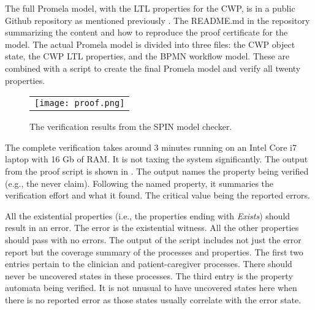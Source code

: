 The full Promela model, with the LTL properties for the CWP, is in a public Github repository as mentioned previously \cite{repo}. The README.md in the repository summarizing the content and how to reproduce the proof certificate for the model. The actual Promela model is divided into three files: the CWP object state, the CWP LTL properties, and the BPMN workflow model. These are combined with a script to create the final Promela model and verify all twenty properties.

\begin{figure}
  \begin{center}
    \begin{tabular}{c}
      \texttt{[image: proof.png]}
    \end{tabular}
  \end{center}
\caption{The verification results from the SPIN model checker.}
\label{fig:proof}
\end{figure}

The complete verification takes around 3 minutes running on an Intel Core i7 laptop with 16 Gb of RAM. It is not taxing the system significantly. The output from the proof script is shown in . The output names the property being verified (e.g., the never claim). Following the named property, it summaries the verification effort and what it found. The critical value being the reported errors.

All the existential properties (i.e., the properties ending with \emph{Exists}) should result in an error. The error is the existential witness. All the other properties should pass with no errors. The output of the script includes not just the error report but the coverage summary of the processes and properties. The first two entries pertain to the clinician and patient-caregiver processes. There should never be uncovered states in these processes. The third entry is the property automata being verified. It is not unusual to have uncovered states here when there is no reported error as those states usually correlate with the error state.
